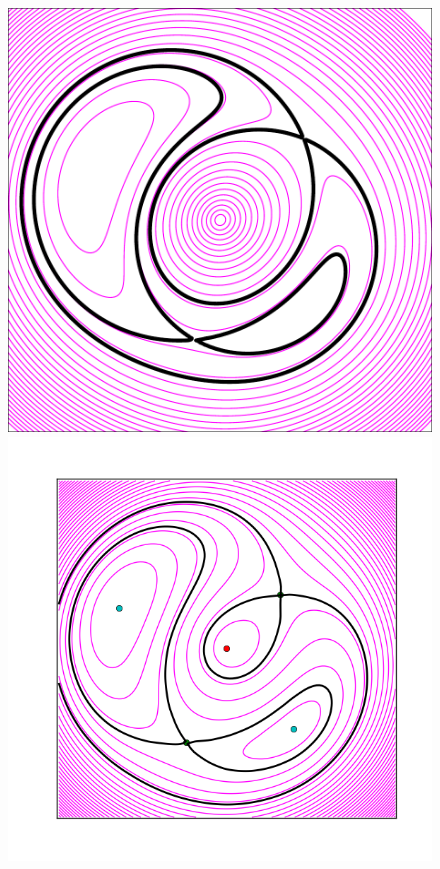 \begin{figure}
  \includegraphics[width=\myplotswidth]{fig/ASW0001hpf_006915_arriv}
  \includegraphics[width=\myplotswidth]{fig/006915_spaghetti} \\

\end{figure}
